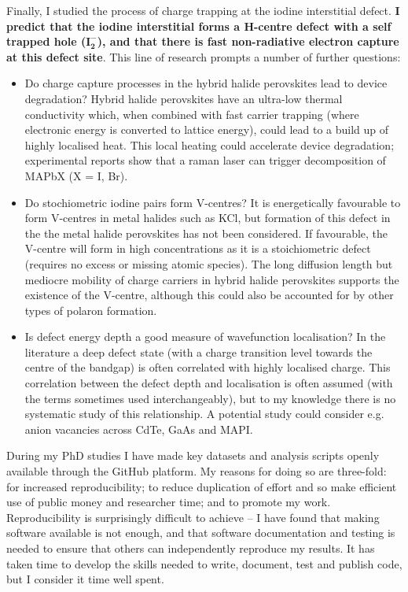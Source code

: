 Finally, I studied the process of charge trapping at the iodine interstitial defect. \textbf{I predict that the iodine interstitial forms a H-centre defect with a self trapped hole ($\mathbf{I_2^-}$), and that there is fast non-radiative electron capture at this defect site}. This line of research prompts a number of further questions:
\begin{itemize}
    \item Do charge capture processes in the hybrid halide perovskites lead to device degradation? Hybrid halide perovskites have an ultra-low thermal conductivity\autocite{Whalley2016} which, when combined with fast carrier trapping (where electronic energy is converted to lattice energy), could lead to a build up of highly localised heat. This local heating could accelerate device degradation; experimental reports show that a raman laser can trigger decomposition of MAPbX (X = I, Br).\autocite{Ledinski2015}
    \item Do stochiometric iodine pairs form V-centres? It is energetically favourable to form V-centres in metal halides such as KCl,\autocite{Castner1957} but formation of this defect in the the metal halide perovskites has not been considered. If favourable, the V-centre will form in high concentrations as it is a stoichiometric defect (requires no excess or missing atomic species). The long diffusion length but mediocre mobility of charge carriers in hybrid halide perovskites\autocite{Brenner2015} supports the existence of the V-centre, although this could also be accounted for by other types of polaron formation. 
    \item Is defect energy depth a good measure of wavefunction localisation? In the literature a deep defect state (with a charge transition level towards the centre of the bandgap) is often correlated with highly localised charge. This correlation between the defect depth and localisation is often assumed (with the terms sometimes used interchangeably), but to my knowledge there is no systematic study of this relationship. A potential study could consider e.g. anion vacancies across CdTe, GaAs and MAPI.
\end{itemize}

During my PhD studies I have made key datasets and analysis scripts openly available through the GitHub platform. My reasons for doing so are three-fold: for increased reproducibility; to reduce duplication of effort and so make efficient use of public money and researcher time; and to promote my work. Reproducibility is surprisingly difficult to achieve -- I have found that making software available is not enough, and that software documentation and testing is needed to ensure that others can independently reproduce my results. It has taken time to develop the skills needed to write, document, test and publish code, but I consider it time well spent.

